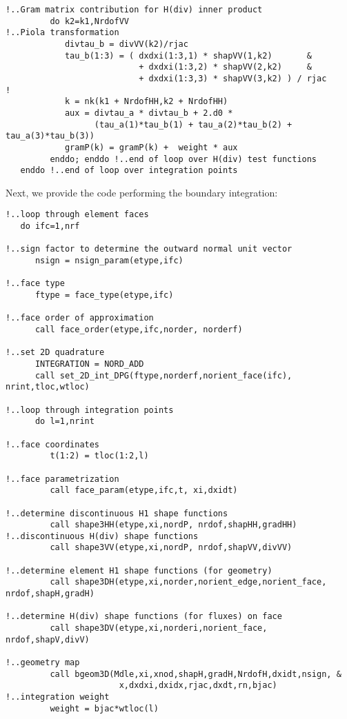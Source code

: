 \begin{lstlisting}[mathescape,caption=\file{POISSON/ULTRAWEAK\_DPG/}\routine{elem}: element integration]
!..Gram matrix contribution for H(div) inner product
         do k2=k1,NrdofVV
!..Piola transformation
            divtau_b = divVV(k2)/rjac
            tau_b(1:3) = ( dxdxi(1:3,1) * shapVV(1,k2)       &
                           + dxdxi(1:3,2) * shapVV(2,k2)     &
                           + dxdxi(1:3,3) * shapVV(3,k2) ) / rjac
!
            k = nk(k1 + NrdofHH,k2 + NrdofHH)
            aux = divtau_a * divtau_b + 2.d0 * 
                  (tau_a(1)*tau_b(1) + tau_a(2)*tau_b(2) + tau_a(3)*tau_b(3))
            gramP(k) = gramP(k) +  weight * aux
         enddo; enddo !..end of loop over H(div) test functions
   enddo !..end of loop over integration points
\end{lstlisting}

Next, we provide the code performing the boundary integration:
\begin{lstlisting}[mathescape,caption=\file{POISSON/ULTRAWEAK\_DPG/}\routine{elem}: boundary integration]
!..loop through element faces
   do ifc=1,nrf

!..sign factor to determine the outward normal unit vector
      nsign = nsign_param(etype,ifc)

!..face type
      ftype = face_type(etype,ifc)

!..face order of approximation
      call face_order(etype,ifc,norder, norderf)

!..set 2D quadrature
      INTEGRATION = NORD_ADD
      call set_2D_int_DPG(ftype,norderf,norient_face(ifc), nrint,tloc,wtloc)

!..loop through integration points
      do l=1,nrint

!..face coordinates
         t(1:2) = tloc(1:2,l)

!..face parametrization
         call face_param(etype,ifc,t, xi,dxidt)

!..determine discontinuous H1 shape functions
         call shape3HH(etype,xi,nordP, nrdof,shapHH,gradHH)
!..discontinuous H(div) shape functions
         call shape3VV(etype,xi,nordP, nrdof,shapVV,divVV)

!..determine element H1 shape functions (for geometry)
         call shape3DH(etype,xi,norder,norient_edge,norient_face, nrdof,shapH,gradH)

!..determine H(div) shape functions (for fluxes) on face
         call shape3DV(etype,xi,norderi,norient_face, nrdof,shapV,divV)

!..geometry map
         call bgeom3D(Mdle,xi,xnod,shapH,gradH,NrdofH,dxidt,nsign, &
                       x,dxdxi,dxidx,rjac,dxdt,rn,bjac)
!..integration weight
         weight = bjac*wtloc(l)


\end{lstlisting}
